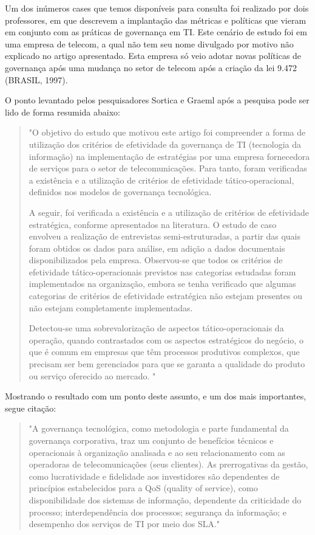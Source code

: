 Um dos inúmeros cases que temos disponíveis para consulta foi realizado por dois professores, em que descrevem a implantação das métricas e políticas que vieram em conjunto com as práticas de governança em TI. Este cenário de estudo foi em uma empresa de telecom, a qual não tem seu nome divulgado por motivo não explicado no artigo apresentado. Esta empresa só veio adotar novas políticas de governança após uma mudança no setor de telecom após a criação da lei 9.472 (BRASIL, 1997)\cite{9472}.

O ponto levantado pelos pesquisadores Sortica e Graeml após a pesquisa pode ser lido de forma resumida abaixo:
\begin{quotation}
"O objetivo do estudo que motivou este artigo foi compreender a forma de utilização dos
critérios de efetividade da governança de TI (tecnologia da informação) na implementação de
estratégias por uma empresa fornecedora de serviços para o setor de telecomunicações. Para tanto, foram verificadas a existência e a utilização de critérios de efetividade tático-operacional, definidos nos modelos de governança tecnológica. 

A seguir, foi verificada a existência e a utilização
de critérios de efetividade estratégica, conforme apresentados na literatura. O estudo de caso
envolveu a realização de entrevistas semi-estruturadas, a partir das quais foram obtidos os dados para análise, em adição a dados documentais disponibilizados pela empresa. Observou-se que todos os critérios de efetividade tático-operacionais previstos nas categorias estudadas foram implementados na organização, embora se tenha verificado que algumas categorias de critérios de efetividade estratégica não estejam presentes ou não estejam completamente implementadas.

Detectou-se uma sobrevalorização de aspectos tático-operacionais da operação, quando contrastados com os aspectos estratégicos do negócio, o que é comum em empresas que têm processos produtivos complexos, que precisam ser bem gerenciados para que se garanta a qualidade do produto ou serviço oferecido ao mercado. \cite{Sortica}"
\end{quotation}

Mostrando o resultado com um ponto deste assunto, e um dos mais importantes, segue citação:
\begin{quotation}
"A governança tecnológica, como metodologia e parte fundamental da governança corporativa,
traz um conjunto de benefícios técnicos e operacionais à organização analisada e ao seu relacionamento
com as operadoras de telecomunicações (seus clientes). As prerrogativas da gestão,
como lucratividade e fidelidade aos investidores são dependentes de princípios estabelecidos para
a QoS (quality of service), como disponibilidade dos sistemas de informação, dependente da
criticidade do processo; interdependência dos processos; segurança da informação; e desempenho
dos serviços de TI por meio dos SLA."  \cite{Sortica}
\end{quotation}

